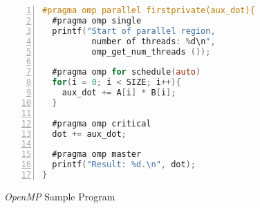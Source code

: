 \begin{figure}[htb]
\begin{minipage}{\linewidth}
\begin{lstlisting}[language=C, basicstyle=\ttfamily\scriptsize, numbers=left,
                   frame=no, showspaces=false, showstringspaces=false,
                   numberstyle=\tiny,
                   xleftmargin=0.6cm,
                   keywords={%
                       \#pragma,
                       omp, parallel, firstprivate,
                       single, omp_get_num_threads,
                       for, schedule, auto,
                       critical, master,
                       NULL, int, main,
                       void, printf, return%
                   },
                   otherkeywords={::, \#pragma, \#include, <<<,>>>, \&, \*, +, -, /, [, ], >, <}
                       ]
#pragma omp parallel firstprivate(aux_dot){
  #pragma omp single
  printf("Start of parallel region,
          number of threads: %d\n",
          omp_get_num_threads ());

  #pragma omp for schedule(auto)
  for(i = 0; i < SIZE; i++){
    aux_dot += A[i] * B[i];
  }

  #pragma omp critical
  dot += aux_dot;

  #pragma omp master
  printf("Result: %d.\n", dot);
}
\end{lstlisting}
\end{minipage}
\caption{\textit{OpenMP} Sample Program}
\label{lst:omp}
\end{figure}



